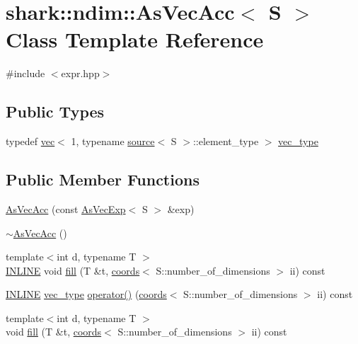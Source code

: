 \hypertarget{classshark_1_1ndim_1_1_as_vec_acc_3_01_s_01_4}{}\section{shark\+:\+:ndim\+:\+:As\+Vec\+Acc$<$ S $>$ Class Template Reference}
\label{classshark_1_1ndim_1_1_as_vec_acc_3_01_s_01_4}


{\ttfamily \#include $<$expr.\+hpp$>$}

\subsection*{Public Types}
\begin{DoxyCompactItemize}
\item 
typedef \hyperlink{structshark_1_1ndim_1_1vec}{vec}$<$ 1, typename \hyperlink{structshark_1_1ndim_1_1source}{source}$<$ S $>$\+::element\+\_\+type $>$ \hyperlink{classshark_1_1ndim_1_1_as_vec_acc_3_01_s_01_4_af7ad5a410cbc56cbfe74caea237b9e07}{vec\+\_\+type}
\end{DoxyCompactItemize}
\subsection*{Public Member Functions}
\begin{DoxyCompactItemize}
\item 
\hyperlink{classshark_1_1ndim_1_1_as_vec_acc_3_01_s_01_4_abd3241939a3644771432342c0557b5a0}{As\+Vec\+Acc} (const \hyperlink{classshark_1_1ndim_1_1_as_vec_exp}{As\+Vec\+Exp}$<$ S $>$ \&exp)
\item 
\hyperlink{classshark_1_1ndim_1_1_as_vec_acc_3_01_s_01_4_a97242ac29d3d50ddbcd8e811f479f61e}{$\sim$\+As\+Vec\+Acc} ()
\item 
{\footnotesize template$<$int d, typename T $>$ }\\\hyperlink{common_8hpp_a2eb6f9e0395b47b8d5e3eeae4fe0c116}{I\+N\+L\+I\+NE} void \hyperlink{classshark_1_1ndim_1_1_as_vec_acc_3_01_s_01_4_af5e77612a584d4ac77c8183cdfb2403f}{fill} (T \&t, \hyperlink{structshark_1_1ndim_1_1coords}{coords}$<$ S\+::number\+\_\+of\+\_\+dimensions $>$ ii) const
\item 
\hyperlink{common_8hpp_a2eb6f9e0395b47b8d5e3eeae4fe0c116}{I\+N\+L\+I\+NE} \hyperlink{classshark_1_1ndim_1_1_as_vec_acc_3_01_s_01_4_af7ad5a410cbc56cbfe74caea237b9e07}{vec\+\_\+type} \hyperlink{classshark_1_1ndim_1_1_as_vec_acc_3_01_s_01_4_aacb0dbfa403236e9354092eb73392976}{operator()} (\hyperlink{structshark_1_1ndim_1_1coords}{coords}$<$ S\+::number\+\_\+of\+\_\+dimensions $>$ ii) const
\item 
{\footnotesize template$<$int d, typename T $>$ }\\void \hyperlink{classshark_1_1ndim_1_1_as_vec_acc_3_01_s_01_4_a643f03cf3988cc525365f2b91e32f6d0}{fill} (T \&t, \hyperlink{structshark_1_1ndim_1_1coords}{coords}$<$ S\+::number\+\_\+of\+\_\+dimensions $>$ ii) const
\end{DoxyCompactItemize}
